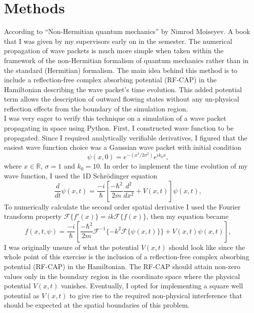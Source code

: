 \documentclass[10pt, a4paper, singlespacing, headsepline]{report}
\begin{document}
\section{Methods}
According to ``Non-Hermitian quantum mechanics'' by Nimrod Moiseyev. A book that I was given by my supervisors early on in the semester. The numerical propagation of wave packets is much more simple when taken within the framework of the non-Hermitian formalism of quantum mechanics rather than in the standard (Hermitian) formalism\cite{Moiseyev}. The main idea behind this method is to include a reflection-free complex absorbing potential (RF-CAP) in the Hamiltonian describing the wave packet's time evolution. This added potential term allows the description of outward flowing states without any un-physical reflection effects from the boundary of the simulation region.\\
I was very eager to verify this technique on a simulation of a wave packet propagating in space using Python. First, I constructed wave function to be propagated. Since I required analytically verifiable derivatives, I figured that the easiest wave function choice was a Gaussian wave packet with initial condition 
\begin{equation} \label{eq:13}
\psi(x, 0) = e^{-(x^2/2\sigma^2)}e^{ik_{0}x},
\end{equation}
where $x \in \mathds{R}$, $\sigma = 1$ and $k_{0} = 10$. In order to implement the time evolution of my wave function, I used the 1D Schrödinger equation
 \begin{equation} \label{eq:14}
\frac{d}{dt}\psi(x, t) = \frac{-i}{\hbar} \left [ \frac{-\hbar^2}{2m} \frac{d^2}{dx^2} + V(x, t)\right ] \psi(x, t),
\end{equation}
To numerically calculate the second order spatial derivative I used the Fourier transform property \mbox{$\mathcal{F}\{f'(x)\} = ik\mathcal{F}\{f(x)\}$}, then my equation became
\begin{equation} \label{eq:15}
f(x, t, \psi) =  \frac{-i}{\hbar} \left [ \frac{-\hbar^2}{2m} \mathcal{F}^{-1}\{-k^2\mathcal{F}\{\psi(x, t)\}\} + V(x, t)\psi(x, t)\right ],
\end{equation}
I was originally unsure of what the potential $V(x,t)$ should look like since the whole point of this exercise is the inclusion of a reflection-free complex absorbing potential (RF-CAP) in the Hamiltonian. The RF-CAP should attain non-zero values only in the boundary region in the coordinate space where the physical potential $V(x,t)$ vanishes\cite{Moiseyev}. Eventually, I opted for implementing a square well potential as $V(x,t)$ to give rise to the required non-physical interference that should be expected at the spatial boundaries of this problem.
\end{document}
